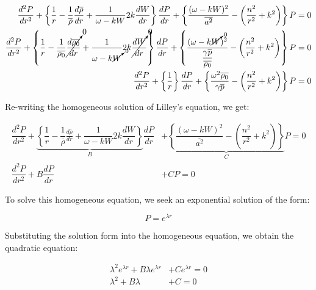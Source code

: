 \documentclass[]{aiaa-tc}%
\begin{document}
\begin{align}
\dfrac{d^2P}{dr^2}
+ \left\{
    \dfrac{1}{r}
    - \dfrac{1}{\overline{\rho}}\frac{d \overline{\rho}}{dr}
    + \dfrac{1}{\omega - kW} 2k \dfrac{dW}{dr}
\right\} \dfrac{dP}{dr}
+ \left\{
    \dfrac{(\omega - kW)^2}{\overline{a^2}}
    - \left( \dfrac{n^2}{r^2} + k^2 \right)
\right\} P = 0 \\
\dfrac{d^2P}{dr^2}
  + \left\{
    \dfrac{1}{r}
    - \dfrac{1}{\overline{\rho_0}} \cancelto{0}{\frac{d \overline{\rho_0}}{dr}}
    + \dfrac{1}{\omega - k\cancelto{0}{W}} 2k \cancelto{0}{\dfrac{dW}{dr}}
\right\} \dfrac{dP}{dr}
 + \left\{
    \dfrac{(\omega - k \cancelto{0}{W})^2}{\dfrac{\gamma \overline{p}}{\overline{\rho_0}}}
    - \left( \dfrac{n^2}{r^2} + k^2 \right)
\right\} P = 0 \\
\dfrac{d^2P}{dr^2}
  + \left\{
    \dfrac{1}{r}
  \right\} \dfrac{dP}{dr}
+ \left\{
    \dfrac{\omega^2\overline{\rho_0}}{\gamma \overline{p}}
    - \left( \dfrac{n^2}{r^2} + k^2 \right)
\right\} P = 0 \\
\end{align}



Re-writing the homogeneous solution of Lilley's equation, we get:

\begin{align*}
\dfrac{d^2P}{dr^2}
+ \underbrace{\left\{
    \dfrac{1}{r}
    - \dfrac{1}{\overline{\rho}}\frac{d \overline{\rho}}{dr}
    + \dfrac{1}{\omega - kW} 2k \dfrac{dW}{dr}
\right\}}_{B} \dfrac{dP}{dr}
&+ \underbrace{ \left\{
    \dfrac{(\omega - kW)^2}{\overline{a^2}}
    - \left( \dfrac{n^2}{r^2} + k^2 \right)
\right\} }_{C} P = 0 \\
\dfrac{d^2P}{dr^2} + B \dfrac{dP}{dr} &+ C P = 0
\end{align*}


To solve this homogeneous equation, we seek an exponential solution of the form:

\newcommand\expsoln{e^{\lambda r}}
\begin{equation} \label{homosolnform}
P = e^{\lambda r}
\end{equation}

Substituting the solution form into the homogeneous equation, we obtain the quadratic equation:

\begin{equation}
\begin{split}
\lambda^2 \expsoln + B \lambda \expsoln & + C \expsoln = 0 \\
\lambda^2 + B \lambda&+ C = 0
\end{split}
\end{equation}
\end{document}
